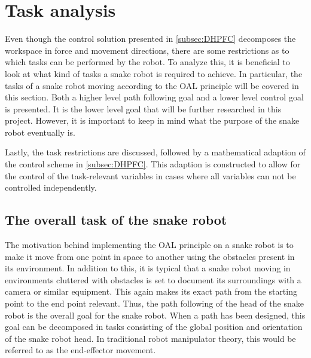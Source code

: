 



\section{Task analysis}

Even though the control solution presented in \ref{subsec:DHPFC} decomposes the workspace in force and movement directions, there are some restrictions as to which tasks can be performed by the robot. To analyze this, it is beneficial to look at what kind of tasks a snake robot is required to achieve. In particular, the tasks of a snake robot moving according to the OAL principle will be covered in this section. Both a higher level path following goal and a lower level control goal is presented. It is the lower level goal that will be further researched in this project. However, it is important to keep in mind what the purpose of the snake robot eventually is.

Lastly, the task restrictions are discussed, followed by a mathematical adaption of the control scheme in \ref{subsec:DHPFC}. This adaption is constructed to allow for the control of the task-relevant variables in cases where all variables can not be controlled independently.

\subsection{The overall task of the snake robot}

The motivation behind implementing the OAL principle on a snake robot is to make it move from one point in space to another using the obstacles present in its environment. In addition to this, it is typical that a snake robot moving in environments cluttered with obstacles is set to document its surroundings with a camera or similar equipment. This again makes its exact path from the starting point to the end point relevant. Thus, the path following of the head of the snake robot is the overall goal for the snake robot. When a path has been designed, this goal can be decomposed in tasks consisting of the global position and orientation of the snake robot head. In traditional robot manipulator theory, this would be referred to as the end-effector movement. 


